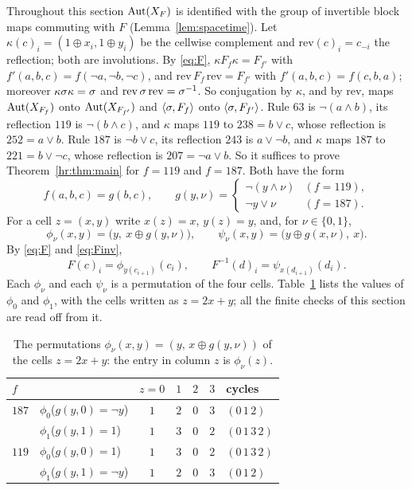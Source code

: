 Throughout this section $\operatorname{Aut}(X_F)$ is identified with the group of invertible block maps commuting with $F$ (Lemma~\ref{lem:spacetime}). Let $\kappa(c)_i=(1\oplus x_i,1\oplus y_i)$ be the cellwise complement and $\mathrm{rev}(c)_i=c_{-i}$ the reflection; both are involutions. By \eqref{eq:F}, $\kappa F_f\kappa=F_{f'}$ with $f'(a,b,c)=f(\neg a,\neg b,\neg c)$, and $\mathrm{rev}\,F_f\,\mathrm{rev}=F_{f'}$ with $f'(a,b,c)=f(c,b,a)$; moreover $\kappa\sigma\kappa=\sigma$ and $\mathrm{rev}\,\sigma\,\mathrm{rev}=\sigma^{-1}$. So conjugation by $\kappa$, and by $\mathrm{rev}$, maps $\operatorname{Aut}(X_{F_f})$ onto $\operatorname{Aut}(X_{F_{f'}})$ and $\langle\sigma,F_f\rangle$ onto $\langle\sigma,F_{f'}\rangle$. Rule $63$ is $\neg(a\wedge b)$, its reflection $119$ is $\neg(b\wedge c)$, and $\kappa$ maps $119$ to $238=b\vee c$, whose reflection is $252=a\vee b$. Rule $187$ is $\neg b\vee c$, its reflection $243$ is $a\vee\neg b$, and $\kappa$ maps $187$ to $221=b\vee\neg c$, whose reflection is $207=\neg a\vee b$. So it suffices to prove Theorem~\ref{hr:thm:main} for $f=119$ and $f=187$. Both have the form
\[
f(a,b,c)=g(b,c),\qquad g(y,\nu)=\begin{cases}\neg(y\wedge \nu)&(f=119),\\ \neg y\vee \nu&(f=187).\end{cases}
\]
For a cell $z=(x,y)$ write $x(z)=x$, $y(z)=y$, and, for $\nu\in\{0,1\}$,
\[
\phi_\nu(x,y)=\bigl(y,\ x\oplus g(y,\nu)\bigr),\qquad \psi_\nu(x,y)=\bigl(y\oplus g(x,\nu),\ x\bigr).
\]
By \eqref{eq:F} and \eqref{eq:Finv},
\begin{equation}\label{hr:eq:half}
F(c)_i=\phi_{y(c_{i+1})}(c_i),\qquad F^{-1}(d)_i=\psi_{x(d_{i+1})}(d_i).
\end{equation}
Each $\phi_\nu$ and each $\psi_\nu$ is a permutation of the four cells. Table~\ref{hr:tab:phi} lists the values of $\phi_0$ and $\phi_1$, with the cells written as $z=2x+y$; all the finite checks of this section are read off from it.

\begin{table}[ht]
\centering
\begin{tabular}{llccccl}
\toprule
$f$ & & $z=0$ & $1$ & $2$ & $3$ & cycles\\
\midrule
$187$ & $\phi_0$\quad($g(y,0)=\neg y$) & $1$ & $2$ & $0$ & $3$ & $(0\,1\,2)$\\
& $\phi_1$\quad($g(y,1)=1$) & $1$ & $3$ & $0$ & $2$ & $(0\,1\,3\,2)$\\
\midrule
$119$ & $\phi_0$\quad($g(y,0)=1$) & $1$ & $3$ & $0$ & $2$ & $(0\,1\,3\,2)$\\
& $\phi_1$\quad($g(y,1)=\neg y$) & $1$ & $2$ & $0$ & $3$ & $(0\,1\,2)$\\
\bottomrule
\end{tabular}
\caption{The permutations $\phi_\nu(x,y)=(y,\,x\oplus g(y,\nu))$ of the cells $z=2x+y$: the entry in column $z$ is $\phi_\nu(z)$.}
\label{hr:tab:phi}
\end{table}

